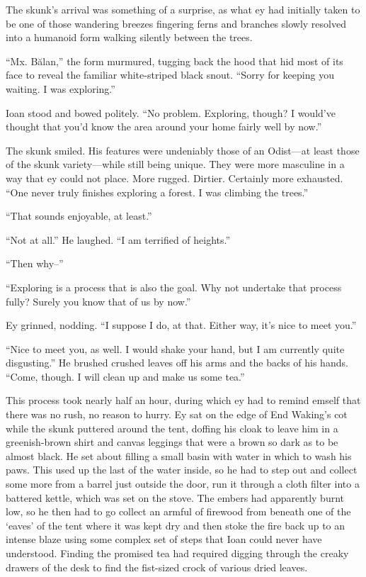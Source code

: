 The skunk's arrival was something of a surprise, as what ey had initially taken to be one of those wandering breezes fingering ferns and branches slowly resolved into a humanoid form walking silently between the trees.

``Mx. Bălan,'' the form murmured, tugging back the hood that hid most of its face to reveal the familiar white-striped black snout. ``Sorry for keeping you waiting. I was exploring.''

Ioan stood and bowed politely. ``No problem. Exploring, though? I would've thought that you'd know the area around your home fairly well by now.''

The skunk smiled. His features were undeniably those of an Odist---at least those of the skunk variety---while still being unique. They were more masculine in a way that ey could not place. More rugged. Dirtier. Certainly more exhausted. ``One never truly finishes exploring a forest. I was climbing the trees.''

``That sounds enjoyable, at least.''

``Not at all.'' He laughed. ``I am terrified of heights.''

``Then why--''

``Exploring is a process that is also the goal. Why not undertake that process fully? Surely you know that of us by now.''

Ey grinned, nodding. ``I suppose I do, at that. Either way, it's nice to meet you.''

``Nice to meet you, as well. I would shake your hand, but I am currently quite disgusting.'' He brushed crushed leaves off his arms and the backs of his hands. ``Come, though. I will clean up and make us some tea.''

This process took nearly half an hour, during which ey had to remind emself that there was no rush, no reason to hurry. Ey sat on the edge of End Waking's cot while the skunk puttered around the tent, doffing his cloak to leave him in a greenish-brown shirt and canvas leggings that were a brown so dark as to be almost black. He set about filling a small basin with water in which to wash his paws. This used up the last of the water inside, so he had to step out and collect some more from a barrel just outside the door, run it through a cloth filter into a battered kettle, which was set on the stove. The embers had apparently burnt low, so he then had to go collect an armful of firewood from beneath one of the `eaves' of the tent where it was kept dry and then stoke the fire back up to an intense blaze using some complex set of steps that Ioan could never have understood. Finding the promised tea had required digging through the creaky drawers of the desk to find the fist-sized crock of various dried leaves.

